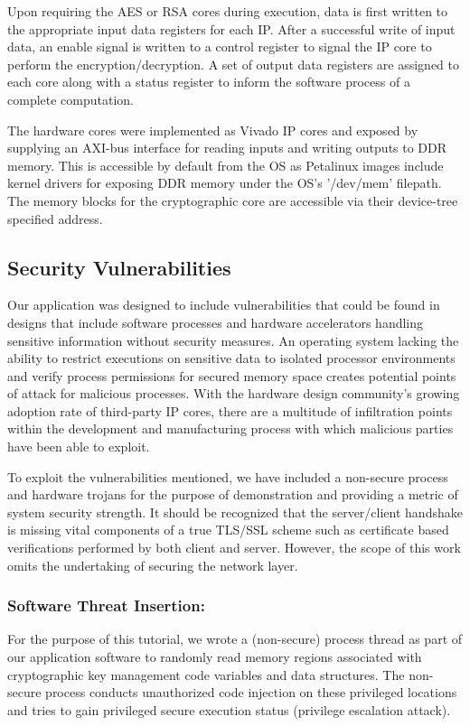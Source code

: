\documentclass[sigconf]{acmart}
\theoremstyle{plain}
\theoremstyle{remark}
\begin{document}
Upon requiring the AES or RSA cores during execution, data is first written to the appropriate input data registers for each IP. After a successful write of input data, an enable signal is written to a control register to signal the IP core to perform the encryption/decryption. A set of output data registers are assigned to each core along with a status register to inform the software process of a complete computation.

The hardware cores were implemented as Vivado IP cores and exposed by supplying an AXI-bus interface for reading inputs and writing outputs to DDR memory. This is accessible by default from the OS as Petalinux images include kernel drivers for exposing DDR memory under the OS's '/dev/mem' filepath. The memory blocks for the cryptographic core are accessible via their device-tree specified address.

\subsection{Security Vulnerabilities}
Our application was designed to include vulnerabilities that could be found in designs that include software processes and hardware accelerators handling sensitive information without security measures. An operating system lacking the ability to restrict executions on sensitive data to isolated processor environments and verify process permissions for secured memory space creates potential points of attack for malicious processes. With the hardware design community's growing adoption rate of third-party IP cores, there are a multitude of infiltration points within the development and manufacturing process with which malicious parties have been able to exploit.

To exploit the vulnerabilities mentioned, we have included a non-secure process and hardware trojans for the purpose of demonstration and providing a metric of system security strength. It should be recognized that the server/client handshake is missing vital components of a true TLS/SSL scheme such as certificate based verifications performed by both client and server. However, the scope of this work omits the undertaking of securing the network layer.

\subsubsection{Software Threat Insertion:}
For the purpose of this tutorial, we wrote a (non-secure) process thread as part of our application software to randomly read memory regions associated with cryptographic key management code variables and data structures. The non-secure process conducts unauthorized code injection on these privileged locations and tries to gain privileged secure execution status (privilege escalation attack).
\end{document}
